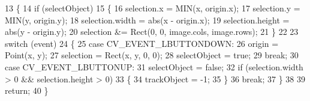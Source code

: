 \begin{DoxyCode}
13 \{
14     \textcolor{keywordflow}{if} (selectObject)
15     \{
16         selection.x = MIN(x, origin.x);
17         selection.y = MIN(y, origin.y);
18         selection.width = abs(x - origin.x);
19         selection.height = abs(y - origin.y);
20         selection &= Rect(0, 0, image.cols, image.rows);
21     \}
22 
23     \textcolor{keywordflow}{switch} (event)
24     \{
25     \textcolor{keywordflow}{case} CV\_EVENT\_LBUTTONDOWN:
26         origin = Point(x, y);
27         selection = Rect(x, y, 0, 0);
28         selectObject = \textcolor{keyword}{true};
29         \textcolor{keywordflow}{break};
30     \textcolor{keywordflow}{case} CV\_EVENT\_LBUTTONUP:
31         selectObject = \textcolor{keyword}{false};
32         \textcolor{keywordflow}{if} (selection.width > 0 && selection.height > 0)
33         \{
34             trackObject = -1;
35         \}
36         \textcolor{keywordflow}{break};
37     \}
38 
39     \textcolor{keywordflow}{return};
40 \}\end{DoxyCode}
